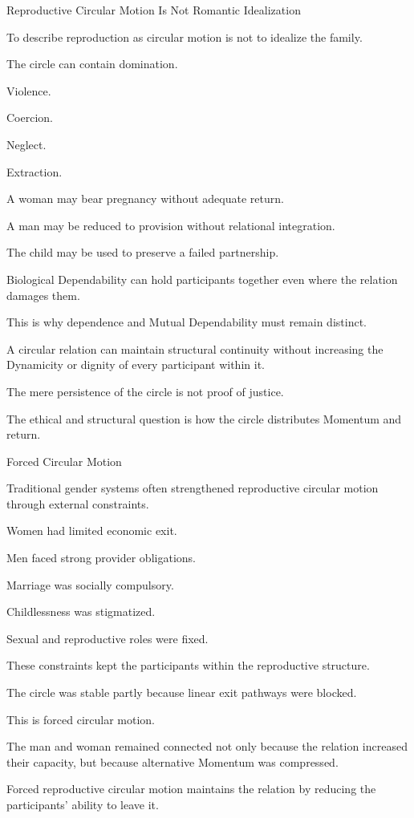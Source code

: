 Reproductive Circular Motion Is Not Romantic Idealization

To describe reproduction as circular motion is not to idealize the family.

The circle can contain domination.

Violence.

Coercion.

Neglect.

Extraction.

A woman may bear pregnancy without adequate return.

A man may be reduced to provision without relational integration.

The child may be used to preserve a failed partnership.

Biological Dependability can hold participants together even where the relation damages them.

This is why dependence and Mutual Dependability must remain distinct.

A circular relation can maintain structural continuity without increasing the Dynamicity or dignity of every participant within it.

The mere persistence of the circle is not proof of justice.

The ethical and structural question is how the circle distributes Momentum and return.

Forced Circular Motion

Traditional gender systems often strengthened reproductive circular motion through external constraints.

Women had limited economic exit.

Men faced strong provider obligations.

Marriage was socially compulsory.

Childlessness was stigmatized.

Sexual and reproductive roles were fixed.

These constraints kept the participants within the reproductive structure.

The circle was stable partly because linear exit pathways were blocked.

This is forced circular motion.

The man and woman remained connected not only because the relation increased their capacity, but because alternative Momentum was compressed.

Forced reproductive circular motion maintains the relation by reducing the participants’ ability to leave it.

